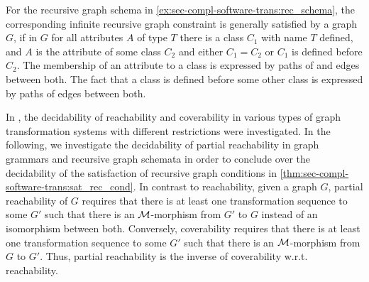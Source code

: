 \begin{example}
\label{ex:sec-compl-software-trans:rec_cond}
For the recursive graph schema in \cref{ex:sec-compl-software-trans:rec_schema}, the corresponding infinite recursive graph constraint is generally satisfied by a graph $G$, if in $G$ for all attributes $A$ of type $T$ there is a class $C_1$ with name $T$ defined, and $A$ is the attribute of some class $C_2$ and either $C_1=C_2$ or $C_1$ is defined before $C_2$.
The membership of an attribute to a class is expressed by paths of  and  edges between both.
The fact that a class is defined before some other class is expressed by paths of  edges between both.
\envEndMarker
\end{example}

In \cite{DBLP:conf/rta/BertrandDKSS12}, the decidability of reachability and coverability in various types of graph transformation systems with different restrictions were investigated.
In the following, we investigate the decidability of partial reachability in graph grammars and recursive graph schemata in order to conclude over the decidability of the satisfaction of recursive graph conditions in \cref{thm:sec-compl-software-trans:sat_rec_cond}.
In contrast to reachability, given a graph $G$, partial reachability of $G$ requires that there is at least one transformation sequence to some $G'$ such that there is an ${\cal M}$-morphism from $G'$ to $G$ instead of an isomorphism between both.
Conversely, coverability requires that there is at least one transformation sequence to some $G'$ such that there is an ${\cal M}$-morphism from $G$ to $G'$.
Thus, partial reachability is the inverse of coverability w.r.t. reachability.

